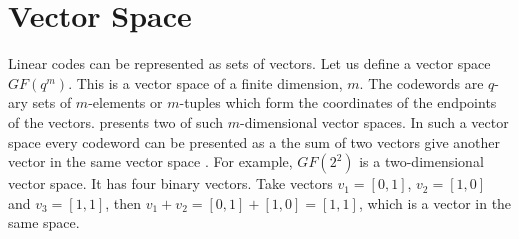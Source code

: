 \documentclass[../main.tex]{subfiles}
\begin{document}
    \newpage


    \section{Vector Space}
    Linear codes can be represented as sets of vectors. Let us define a vector space ${GF(q^m)}$. This is a vector space of a finite dimension, $m$. The codewords are $q$-ary sets of $m$-elements or $m$-tuples which form the coordinates of the endpoints of the vectors.  presents two of such $m$-dimensional vector spaces. In such a vector space every codeword can be presented as a the sum of two vectors give another vector in the same vector space \autocite{bose2008information}. For example, ${GF(2^2)}$ is a two-dimensional vector space. It has four binary vectors. Take vectors $v_1=[0,1]$, $v_2=[1,0]$ and $v_3=[1,1]$, then $v_1+v_2=[0,1]+[1,0]=[1,1]$, which is a vector in the same space.
\end{document}
